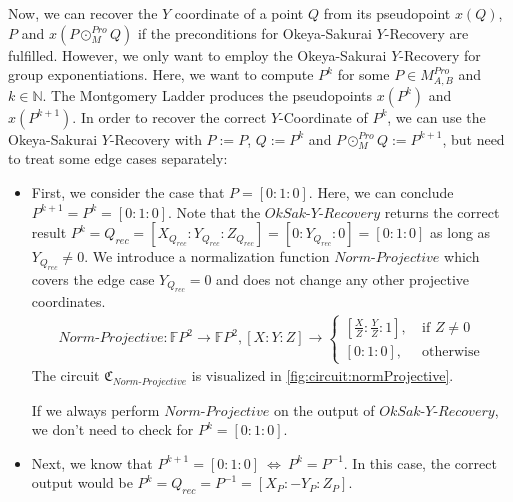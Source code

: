 Now, we can recover the $Y$ coordinate of a point $Q$ from its pseudopoint $x(Q)$, $P$ and $x(P\odot_M^{Pro} Q)$ if the preconditions for Okeya-Sakurai $Y$-Recovery are fulfilled.
However, we only want to employ the Okeya-Sakurai $Y$-Recovery for group exponentiations.
Here, we want to compute $P^k$ for some $P\in M_{A,B}^{Pro}$ and $k\in \mathbb{N}$.
The Montgomery Ladder produces the pseudopoints $x(P^k)$ and $x(P^{k+1})$.
In order to recover the correct $Y$-Coordinate of $P^k$, we can use the Okeya-Sakurai $Y$-Recovery with $P:=P$, $Q:=P^k$ and $P\odot_M^{Pro} Q:=P^{k+1}$, but need to treat some edge cases separately:
\begin{itemize}
    \item First, we consider the case that $P=[0:1:0]$. 
    Here, we can conclude $P^{k+1}=P^k=[0:1:0]$.
    Note that the $OkSak\text{-}Y\text{-}Recovery$ returns the correct result $P^k=Q_{rec}=[X_{Q_{rec}}:Y_{Q_{rec}}:Z_{Q_{rec}}]=[0:Y_{Q_{rec}}:0]=[0:1:0]$ as long as $Y_{Q_{rec}}\neq 0$.
    We introduce a normalization function $Norm\text{-}Projective$ which covers the edge case $Y_{Q_{rec}}=0$ and does not change any other projective coordinates.
    \begin{align*}
        Norm\text{-}Projective:\mathbb{F}P^2\to\mathbb{F}P^2, [X:Y:Z]\to\begin{cases}
            \left[\frac{X}{Z}:\frac{Y}{Z}:1\right], &\:\text{if } Z\neq 0\\
            [0:1:0], &\:\text{otherwise}
        \end{cases}
    \end{align*}
    The circuit $\mathfrak{C}_{Norm\text{-}Projective}$ is visualized in \cref{fig:circuit:normProjective}.

    If we always perform $Norm\text{-}Projective$ on the output of $OkSak\text{-}Y\text{-}Recovery$, we don't need to check for $P^k=[0:1:0]$.
    \item Next, we know that $P^{k+1}=[0:1:0]\:\Leftrightarrow\:P^k=P^{-1}$.
    In this case, the correct output would be $P^k=Q_{rec}=P^{-1}=[X_P:-Y_P:Z_P]$.
\end{itemize}

